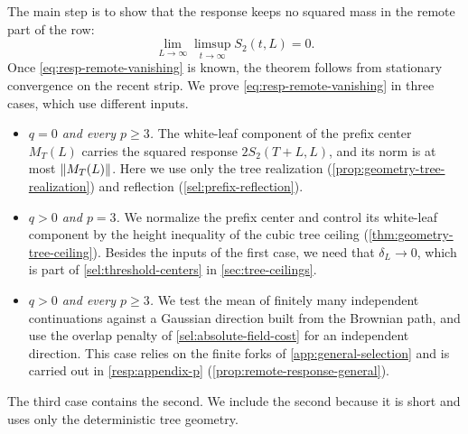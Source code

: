 The main step is to show that the response keeps no squared mass in the remote part of the row:
\begin{equation}\label{eq:resp-remote-vanishing}
 \lim_{L\to\infty}\limsup_{t\to\infty}S_2(t,L)=0.
\end{equation}
Once \eqref{eq:resp-remote-vanishing} is known, the theorem follows from stationary convergence on the recent strip. We prove \eqref{eq:resp-remote-vanishing} in three cases, which use different inputs.
\begin{itemize}
\item \emph{$q=0$ and every $p\ge3$.} The white-leaf component of the prefix center $M_T(L)$ carries the squared response $2S_2(T+L,L)$, and its norm is at most $\lVert M_T(L)\rVert$. Here we use only the tree realization (\cref{prop:geometry-tree-realization}) and reflection (\cref{sel:prefix-reflection}).
\item \emph{$q>0$ and $p=3$.} We normalize the prefix center and control its white-leaf component by the height inequality of the cubic tree ceiling (\cref{thm:geometry-tree-ceiling}). Besides the inputs of the first case, we need that $\delta_L\to0$, which is part of \cref{sel:threshold-centers} in \cref{sec:tree-ceilings}.
\item \emph{$q>0$ and every $p\ge3$.} We test the mean of finitely many independent continuations against a Gaussian direction built from the Brownian path, and use the overlap penalty of \cref{sel:absolute-field-cost} for an independent direction. This case relies on the finite forks of \cref{app:general-selection} and is carried out in \cref{resp:appendix-p} (\cref{prop:remote-response-general}).
\end{itemize}
The third case contains the second. We include the second because it is short and uses only the deterministic tree geometry.

